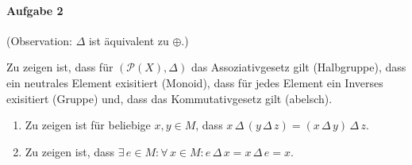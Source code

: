 \documentclass{article}
\newcommand{\Deltaop}{\, \Delta \,}
\begin{document}


\paragraph{Aufgabe 2}

(Observation: $\Delta$ ist äquivalent zu $\oplus$.)

Zu zeigen ist, dass für $(\mathcal{P}(X), \Delta)$ das Assoziativgesetz gilt (Halbgruppe), dass ein neutrales Element exisitiert (Monoid), dass für jedes Element ein Inverses exisitiert (Gruppe) und, dass das Kommutativgesetz gilt (abelsch).

\begin{enumerate}
    \item Zu zeigen ist für beliebige $x, y \in M$, dass $x \Deltaop (y \Deltaop z) = (x \Deltaop y) \Deltaop z$.

    \item Zu zeigen ist, dass $\exists\, e \in M : \forall\, x \in M : e \Deltaop x = x \Deltaop e = x$.
\end{enumerate}
\end{document}
